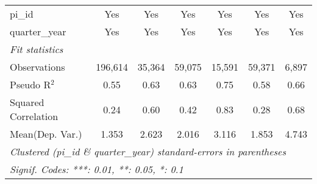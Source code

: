 \begin{tabular}{lcccccc}
   pi\_id                                                     & Yes           & Yes           & Yes           & Yes           & Yes           & Yes\\  
   quarter\_year                                              & Yes           & Yes           & Yes           & Yes           & Yes           & Yes\\  
   \midrule
   \emph{Fit statistics}\\
   Observations                                               & 196,614       & 35,364        & 59,075        & 15,591        & 59,371        & 6,897\\  
   Pseudo R$^2$                                               & 0.55          & 0.63          & 0.63          & 0.75          & 0.58          & 0.66\\  
   Squared Correlation                                        & 0.24          & 0.60          & 0.42          & 0.83          & 0.28          & 0.68\\  
Mean(Dep. Var.) & 1.353 & 2.623 & 2.016 & 3.116 & 1.853 & 4.743 \\
   \midrule \midrule
   \multicolumn{7}{l}{\emph{Clustered (pi\_id \& quarter\_year) standard-errors in parentheses}}\\
   \multicolumn{7}{l}{\emph{Signif. Codes: ***: 0.01, **: 0.05, *: 0.1}}\\
\end{tabular}
\par\endgroup
